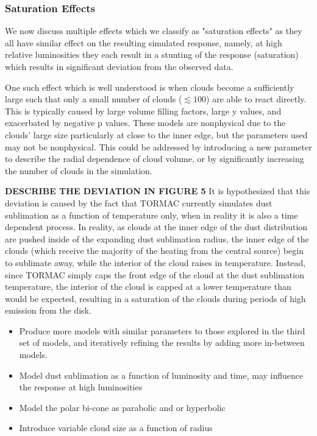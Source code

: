 \subsubsection{Saturation Effects}
\par We now discuss multiple effects which we classify as "saturation effects" as they all have similar effect on the resulting simulated response, namely, at high relative luminosities they each result in a stunting of the response (saturation) which results in significant deviation from the observed data. 
\par One such effect which is well understood is when clouds become a sufficiently large such that only a small number of clouds ($\lesssim100$) are able to react directly. This is typically caused by large volume filling factors, large y values, and exacerbated by negative p values. These models are nonphysical due to the clouds' large size particularly at close to the inner edge, but the parameters used may not be nonphysical. This could be addressed by introducing a new parameter to describe the radial dependence of cloud volume, or by significantly increasing the number of clouds in the simulation.
\par {\bf DESCRIBE THE DEVIATION IN FIGURE 5} It is hypothesized that this deviation is caused by the fact that TORMAC currently simulates dust sublimation as a function of temperature only, when in reality it is also a time dependent process. In reality, as clouds at the inner edge of the dust distribution are pushed inside of the expanding dust sublimation radius, the inner edge of the clouds (which receive the majority of the heating from the central source) begin to sublimate away, while the interior of the cloud raises in temperature. Instead, since TORMAC simply caps the front edge of the cloud at the dust sublimation temperature, the interior of the cloud is capped at a lower temperature than would be expected, resulting in a saturation of the clouds during periods of high emission from the disk. 
\begin{itemize}
    \item Produce more models with similar parameters to those explored in the third set of models, and iteratively refining the results by adding more in-between models.
    \item Model dust sublimation as a function of luminosity and time, may influence the response at high luminosities
    \item Model the polar bi-cone as parabolic and or hyperbolic
    \item Introduce variable cloud size as a function of radius
\end{itemize}